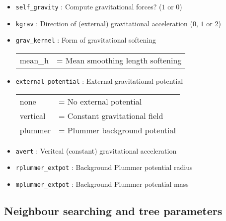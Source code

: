 \documentclass[a4paper]{article}
\newcommand{\var}[1]{\texttt{#1}}
\begin{document}
\begin{itemize}

\item \var{self\_gravity} : Compute gravitational forces?   ($1$ or $0$)

\item \var{kgrav} : Direction of (external) gravitational acceleration ($0$, $1$ or $2$)

\item \var{grav\_kernel} : Form of gravitational softening \\
\begin{tabular}{ll}
mean\_h   & = Mean smoothing length softening
\end{tabular}

\item \var{external\_potential} : External gravitational potential \\
\begin{tabular}{ll}
none     & = No external potential \\
vertical & = Constant gravitational field \\
plummer  & = Plummer background potential
\end{tabular}

\item \var{avert} : Veritcal (constant) gravitational acceleration

\item \var{rplummer\_extpot} : Background Plummer potential radius

\item \var{mplummer\_extpot} : Background Plummer potential mass

\end{itemize}



\subsection{Neighbour searching and tree parameters}
\end{document}
